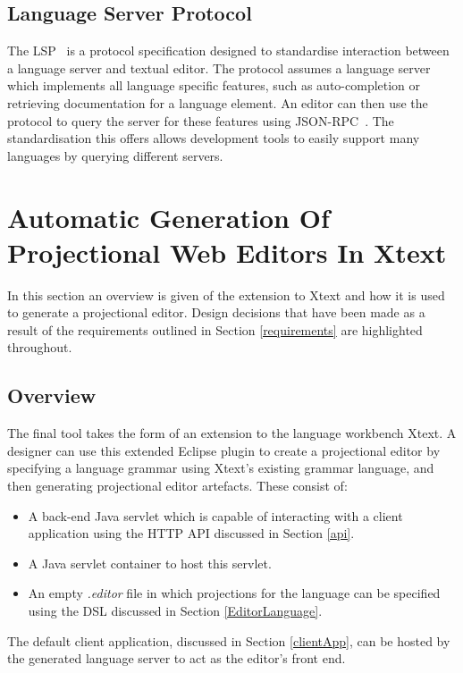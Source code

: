 \documentclass{article}
\begin{document}
\subsection{Language Server Protocol}\label{lsp}
The LSP~\cite{lsp} is a protocol specification designed to standardise interaction between a language server and textual editor. The protocol assumes a language server which implements all language specific features, such as auto-completion or retrieving documentation for a language element. An editor can then use the protocol to query the server for these features using JSON-RPC~\cite{jsonrpc}. The standardisation this offers allows development tools to easily support many languages by querying different servers.
%
%
%
%
%
%
\section{Automatic Generation Of Projectional Web Editors In Xtext}\label{generation}
In this section an overview is given of the extension to Xtext and how it is used to generate a projectional editor. Design decisions that have been made as a result of the requirements outlined in Section \ref{requirements} are highlighted throughout. 

\subsection{Overview}

The final tool takes the form of an extension to the language workbench Xtext. A designer can use this extended Eclipse plugin to create a projectional editor by specifying a language grammar using Xtext's existing grammar language, and then generating projectional editor artefacts. These consist of:
\begin{itemize}
\item A back-end Java servlet which is capable of interacting with a client application using the HTTP API discussed in Section \ref{api}.
\item A Java servlet container to host this servlet.
\item An empty \emph{.editor} file in which projections for the language can be specified using the DSL discussed in Section \ref{EditorLanguage}. 
\end{itemize}
%
The default client application, discussed in Section \ref{clientApp}, can be hosted by the generated language server to act as the editor's front end. 
\end{document}
